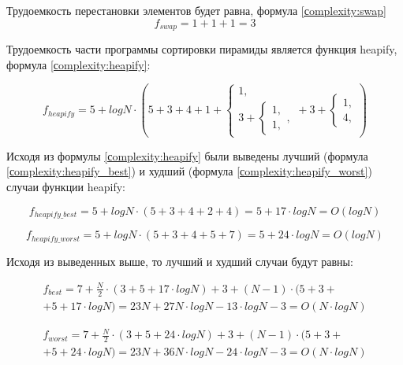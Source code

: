 Трудоемкость перестановки элементов будет равна, формула \ref{сomplexity:swap}
\begin{equation}
	\label{сomplexity:swap}
	f_{swap} = 1 + 1 + 1 = 3
\end{equation}

Трудоемкость части программы сортировки пирамиды является функция heapify, формула \ref{сomplexity:heapify}:

\begin{equation}
	\label{сomplexity:heapify}
	f_{heapify} = 5 + log N \cdot (5 + 3 + 4 + 1 + 
	\begin{cases}
		1, \\
		3 + \begin{cases}
			1, \\
			1,
		\end{cases},
	\end{cases} + 3 +
	\begin{cases}
		1, \\
		4,
	\end{cases})
\end{equation}

Исходя из формулы \ref{сomplexity:heapify} были выведены лучший (формула \ref{сomplexity:heapify_best}) и худший (формула \ref{сomplexity:heapify_worst}) случаи функции heapify:

\begin{equation}
	\label{сomplexity:heapify_best}
	f_{heapify\_best} = 5 + log N \cdot (5 + 3 + 4 + 2 + 4) = 5 + 17 \cdot log N = O(log N) 
\end{equation}

\begin{equation}
	\label{сomplexity:heapify_worst}
	f_{heapify\_worst} = 5 + log N \cdot (5 + 3 + 4 + 5 + 7) = 5 + 24 \cdot log N = O(log N) 
\end{equation}

Исходя из выведенных выше, то лучший и худший случаи будут равны: 

\begin{equation}
	\label{сomplexity:heap_best_p}
	\begin{aligned}
		f_{best} = 7 + \frac{N}{2} \cdot (3 + 5 + 17 \cdot log N) + 3 + (N - 1) \cdot (5 + 3 + \\ 
		+ 5 + 17 \cdot log N) = 23N + 27N \cdot log N - 13 \cdot log N - 3 = O(N \cdot log N)
	\end{aligned}
\end{equation}

\begin{equation}
	\label{сomplexity:heap_worst_p}
	\begin{aligned}
		f_{worst} = 7 + \frac{N}{2} \cdot (3 + 5 + 24 \cdot log N) + 3 + (N - 1) \cdot (5 + 3 + \\ 
		+ 5 + 24 \cdot log N) = 23N + 36N \cdot log N - 24 \cdot log N - 3 = O(N \cdot log N)
	\end{aligned}
\end{equation}

